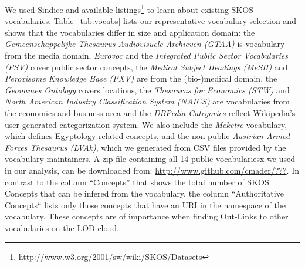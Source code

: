 We used Sindice and available listings\footnote{\url{http://www.w3.org/2001/sw/wiki/SKOS/Datasets}} to learn about existing SKOS vocabularies. Table~\ref{tab:vocabs} lists our representative vocabulary selection and shows that the vocabularies differ in size and application domain: the \emph{Gemeenschappelijke Thesaurus Audiovisuele Archieven (GTAA)} is vocabulary from the media domain, \emph{Eurovoc} and the \emph{Integrated Public Sector Vocabularies (PSV)} cover public sector concepts, the \emph{Medical Subject Headings (MeSH)} and \emph{Peroxisome Knowledge Base (PXV)} are from the (bio-)medical domain, the \emph{Geonames Ontology} covers locations, the \emph{Thesaurus for Economics (STW)} and \emph{North American Industry Classification System (NAICS)} are vocabularies from the economics and business area and the \emph{DBPedia Categories} reflect Wikipedia's user-generated categorization system. We also include the \emph{Meketre} vocabulary, which defines Egyptology-related concepts, and the non-public \emph{Austrian Armed Forces Thesaurus (LVAk)}, which we generated from CSV files provided by the vocabulary maintainers. A zip-file containing all 14 public vocabulariesx we used in our analysis, can be downloaded from: \url{http://www.github.com/cmader/???}. In contrast to the column ``Concepts'' that shows the total number of SKOS Concepts that can be infered from the vocabulary, the column ``Authoritative Concepts`` lists only those concepts that have an URI in the namespace of the vocabulary. These concepts are of importance when finding Out-Links to other vocabularies on the LOD cloud.

